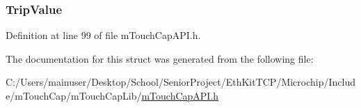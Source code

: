 \hypertarget{struct_s_l_i_d_e_r4_c_h_abc6bec2968b498197fc0e64c3729fb0c}{}
\subsubsection[{Trip\+Value}]{ Trip\+Value}\label{struct_s_l_i_d_e_r4_c_h_abc6bec2968b498197fc0e64c3729fb0c}


Definition at line 99 of file m\+Touch\+Cap\+A\+P\+I.\+h.



The documentation for this struct was generated from the following file\+:\begin{DoxyCompactItemize}
\item 
C\+:/\+Users/mainuser/\+Desktop/\+School/\+Senior\+Project/\+Eth\+Kit\+T\+C\+P/\+Microchip/\+Include/m\+Touch\+Cap/m\+Touch\+Cap\+Lib/\hyperlink{m_touch_cap_a_p_i_8h}{m\+Touch\+Cap\+A\+P\+I.\+h}\end{DoxyCompactItemize}
